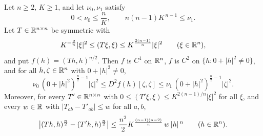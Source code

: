 \begin{lemma}
Let $n\ge2$, $K\ge1$, and let $\nu_0,\nu_1$ satisfy
\[
0<\nu_0\le\frac nK,\qquad n(n-1)K^{\,n-1}\le\nu_1 .
\]
Let $T\in\mathbb{R}^{n\times n}$ be symmetric with
\[
K^{-\frac2n}|\xi|^2\le(T\xi,\xi)\le K^{\frac{2(n-1)}n}|\xi|^2
\qquad(\xi\in\mathbb{R}^n),
\]
and put $f(h)=(Th,h)^{n/2}$.  Then $f$ is $C^1$ on $\mathbb{R}^n$, $f$ is $C^2$ on
$\{h:0+|h|^2\ne0\}$, and for all $h,\zeta\in\mathbb{R}^n$ with $0+|h|^2\ne0$,
\[
\nu_0\,(0+|h|^2)^{\frac n2-1}|\zeta|^2
\le D^2f(h)[\zeta,\zeta]
\le\nu_1\,(0+|h|^2)^{\frac n2-1}|\zeta|^2 .
\]
Moreover, for every $T'\in\mathbb{R}^{n\times n}$ with
$0\le(T'\xi,\xi)\le K^{2(n-1)/n}|\xi|^2$ for all $\xi$, and every $w\in\mathbb{R}$ with
$|T_{ab}-T'_{ab}|\le w$ for all $a,b$,
\[
\bigl|(Th,h)^{\frac n2}-(T'h,h)^{\frac n2}\bigr|
\le\frac{n^2}2K^{\frac{(n-1)(n-2)}n}\,w\,|h|^{\,n}
\qquad(h\in\mathbb{R}^n).
\]
\end{lemma}
